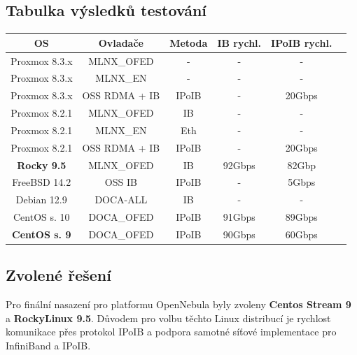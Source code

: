 \subsection{Tabulka výsledků testování}
\begin{center}
    
\begin{tabular}{|c|c|c|c|c|c|}
    \hline
    \textbf{OS} &
    \textbf{Ovladače} &
    \textbf{Metoda} &
    \textbf{IB rychl.} &
    \textbf{IPoIB rychl.} \\
    \hline
Proxmox 8.3.x & MLNX\_OFED   & -   & - & -  \\
\hline
Proxmox 8.3.x & MLNX\_EN   & -   & - & -  \\
\hline
Proxmox 8.3.x & OSS RDMA + IB   & IPoIB & - & 20Gbps \\
\hline
Proxmox 8.2.1 & MLNX\_OFED   & IB & - & -   \\
\hline
Proxmox 8.2.1 & MLNX\_EN     & Eth & - & - \\
\hline
Proxmox 8.2.1 & OSS RDMA + IB   & IPoIB & - & 20Gbps  \\
\hline
\textbf{Rocky 9.5} & MLNX\_OFED & IB & 92Gbps & 82Gbp  \\
\hline
FreeBSD 14.2 & OSS IB & IPoIB & - & 5Gbps  \\
\hline
Debian 12.9 & DOCA-ALL & IB & - &  -  \\
\hline
CentOS s. 10 & DOCA\_OFED & IPoIB & 91Gbps &  89Gbps  \\
\hline
\textbf{CentOS s. 9} & DOCA\_OFED & IPoIB & 90Gbps &  60Gbps  \\
\hline
\end{tabular}
\end{center}

\subsection{Zvolené řešení}

Pro finální nasazení pro platformu OpenNebula byly zvoleny \textbf{Centos Stream 9} a \textbf{RockyLinux 9.5}. Důvodem pro volbu těchto Linux distribucí je rychlost komunikace přes protokol IPoIB\cite{IPoIB} a podpora samotné síťové implementace pro InfiniBand\cite{InfiniBand} a IPoIB\cite{IPoIB}. 